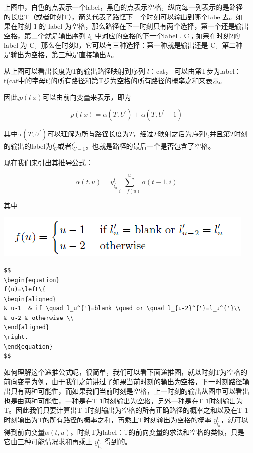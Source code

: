 \documentclass[]{book}
\theoremstyle{definition}
\theoremstyle{definition}
\theoremstyle{definition}
\theoremstyle{remark}
\begin{document}
上图中，白色的点表示一个label，黑色的点表示空格，纵向每一列表示的是路径的长度T（或者时刻T），箭头代表了路径下一个时刻可以输出到哪个label去。如果在时刻
1 的 label
为空格，那么路径在下一时刻只有两个选择，第一个还是输出空格，第二个就是输出序列
\(l_1\) 中对应的空格的下一个label：C；如果在时刻2的 label 为
C，那么在时刻3，它可以有三种选择：第一种就是输出还是
C，第二种是输出为空格，第三种是直接输出A。

从上图可以看出长度为T的输出路径映射到序列 \(l\)：cat，
可以由第T步为label：t(cat中的字母t)的所有路径和第T步为空格的所有路径的概率之和来表示。

因此,\(p(l|x)\)可以由前向变量来表示，即为

\[p(l|x)=\alpha(T,U^{'})+\alpha(T,U^{'}-1)\]

其中\(\alpha(T,U^{'})\)可以理解为所有路径长度为\(T\)，经过\(F\)映射之后为序列\(l\),并且第\(T\)时刻的输出的label为\(l^{'}_U\)或者\(l^{'}_{U-1}\)。也就是路径的最后一个是否包含了空格。

现在我们来引出其推导公式：

\[\alpha(t,u)=y_{l^{'}_u}^t\sum_{i=f(u)}^u\alpha(t-1,i)\]

其中

\begin{center}\includegraphics[width=1.5\linewidth]{pic/fig_5} \end{center}

\begin{verbatim}
$$
\begin{equation}
f(u)=\left\{
\begin{aligned}
& u-1  & if \quad l_u^{'}=blank \quad or \quad l_{u-2}^{'}=l_u^{'}\\
& u-2 & otherwise \\
\end{aligned}
\right.
\end{equation}
$$
\end{verbatim}

如何理解这个递推公式呢，很简单，我们可以看下面递推图，就以时刻T为空格的前向变量为例，由于我们之前讲过了如果当前时刻的输出为空格，下一时刻路径输出只有两种可能性，而如果我们当前时刻是空格，上一时刻的输出从图中可以看出也是由两种可能性，一种是在T-1时刻输出为空格，另外一种是在T-1时刻输出为T。因此我们只要计算出T-1时刻输出为空格的所有正确路径的概率之和以及在T-1时刻输出为T的所有路径的概率之和，再乘上T时刻输出为空格的概率
\(y_{l_u^{'}}^t\)，就可以得到前向变量\(\alpha(t,u)\)。时刻T为label：T的前向变量的求法和空格的类似，只是它由三种可能情况求和再乘上
\(y_{l_u^{'}}^t\) 得到的。
\end{document}
